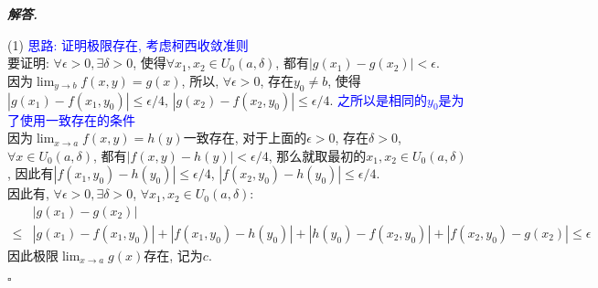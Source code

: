 \documentclass[10pt, a4paper, oneside]{ctexart}
\newenvironment{solution}{%
  \par\noindent\textbf{\textit{解答. }}\ignorespaces
}{%
  \hfill\ensuremath{\square}\par %
}
\begin{document}
\begin{solution}
(1) \textcolor{blue}{思路: 证明极限存在, 考虑柯西收敛准则}\\
要证明: $\forall \epsilon>0, \exists \delta>0$, 使得$\forall x_1,x_2 \in U_0(a,\delta)$, 都有$|g(x_1)-g(x_2) |<\epsilon$.\\
因为$\lim_{y\to b}f(x,y)=g(x)$, 所以, $\forall \epsilon>0$, 存在$y_0\neq b$, 使得$|g(x_1)-f(x_1,y_0) |\leq \epsilon/4$, $|g(x_2)-f(x_2,y_0) |\leq \epsilon/4$. \textcolor{blue}{之所以是相同的$y_0$是为了使用一致存在的条件}\\
因为$\lim_{x\to a}f(x,y)=h(y)$一致存在, 对于上面的$\epsilon>0$, 存在$\delta>0$, $\forall x\in U_0(a,\delta)$, 都有$|f(x,y)-h(y) |<\epsilon/4$, 那么就取最初的$x_1,x_2\in U_0(a,\delta)$, 因此有$ |f(x_1,y_0)-h(y_0) |\leq \epsilon/4 $, $ |f(x_2,y_0)-h(y_0) |\leq \epsilon/4 $.\\
因此有, $\forall \epsilon>0, \exists \delta>0$, $\forall x_1,x_2\in U_0(a,\delta)$:
\begin{align*}
    &|g(x_1)-g(x_2) |\\\leq& |g(x_1)-f(x_1,y_0) |+|f(x_1,y_0)-h(y_0) |+|h(y_0)-f(x_2,y_0) |+|f(x_2,y_0)-g(x_2) |\leq \epsilon
\end{align*}
因此极限$\lim_{x\to a}g(x)$存在, 记为$c$.


\end{solution}
\end{document}
